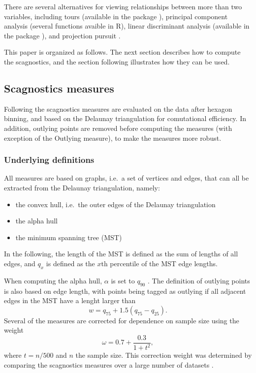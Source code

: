 There are several alternatives for viewing relationships between more
than two variables, including tours \citep{As85} (available in the
 package \citep{tourr}), principal component analysis
(several functions avaible in R), linear discriminant analysis
(available in the package \citep{MASS}), and projection
pursuit \citep{f87}.

This paper is organized as follows. The next section describes how to
compute the scagnostics, and the section following illustrates how they
can be used.

\hypertarget{scagnostics-measures}{%
\subsection{Scagnostics measures}\label{scagnostics-measures}}

Following \citet{scag} the scagnostics measures are evaluated on the
data after hexagon binning, and based on the Delaunay triangulation for
comutational efficiency. In addition, outlying points are removed before
computing the measures (with exception of the Outlying measure), to make
the measures more robust.

\hypertarget{underlying-definitions}{%
\subsubsection{Underlying definitions}\label{underlying-definitions}}

All measures are based on graphs, i.e.~a set of vertices and edges, that
can all be extracted from the Delaunay triangulation, namely:

\begin{itemize}
\tightlist
\item
  the convex hull, i.e.~the outer edges of the Delaunay triangulation
\item
  the alpha hull \citep{1056714}
\item
  the minimum spanning tree (MST) \citep{kruskal1956}
\end{itemize}

In the following, the length of the MST is defined as the sum of lengths
of all edges, and \(q_x\) is defined as the \(x\)th percentile of the
MST edge lengths.

When computing the alpha hull, \(\alpha\) is set to \(q_{90}\)
\citep{scag}. The definition of outlying points is also based on edge
length, with points being tagged as outlying if all adjacent edges in
the MST have a lenght larger than \begin{equation}
w = q_{75} + 1.5 ( q_{75} - q_{25}).
\label{eq:w}
\end{equation} Several of the measures are corrected for dependence on
sample size using the weight \begin{equation}
\omega = 0.7 + \frac{0.3}{1+t^2},
\end{equation} where \(t = n / 500\) and \(n\) the sample size. This
correction weight was determined by comparing the scagnostics measures
over a large number of datasets \citep{scag}.

